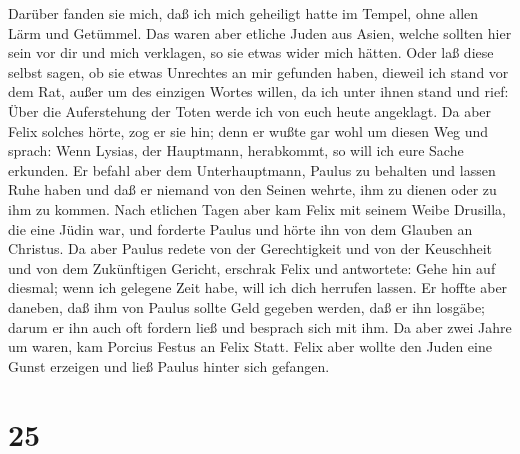  Darüber fanden sie mich, daß ich mich geheiligt hatte im
Tempel, ohne allen Lärm und Getümmel.  Das waren aber
etliche Juden aus Asien, welche sollten hier sein vor dir und mich
verklagen, so sie etwas wider mich hätten.  Oder laß diese
selbst sagen, ob sie etwas Unrechtes an mir gefunden haben, dieweil ich
stand vor dem Rat,  außer um des einzigen Wortes willen, da
ich unter ihnen stand und rief: Über die Auferstehung der Toten werde
ich von euch heute angeklagt.  Da aber Felix solches hörte,
zog er sie hin; denn er wußte gar wohl um diesen Weg und sprach: Wenn
Lysias, der Hauptmann, herabkommt, so will ich eure Sache erkunden.
 Er befahl aber dem Unterhauptmann, Paulus zu behalten und
lassen Ruhe haben und daß er niemand von den Seinen wehrte, ihm zu
dienen oder zu ihm zu kommen.  Nach etlichen Tagen aber kam
Felix mit seinem Weibe Drusilla, die eine Jüdin war, und forderte Paulus
und hörte ihn von dem Glauben an Christus.  Da aber Paulus
redete von der Gerechtigkeit und von der Keuschheit und von dem
Zukünftigen Gericht, erschrak Felix und antwortete: Gehe hin auf
diesmal; wenn ich gelegene Zeit habe, will ich dich herrufen lassen.
 Er hoffte aber daneben, daß ihm von Paulus sollte Geld
gegeben werden, daß er ihn losgäbe; darum er ihn auch oft fordern ließ
und besprach sich mit ihm.  Da aber zwei Jahre um waren,
kam Porcius Festus an Felix Statt. Felix aber wollte den Juden eine
Gunst erzeigen und ließ Paulus hinter sich gefangen.

\hypertarget{section-24}{%
\section{25}\label{section-24}}

